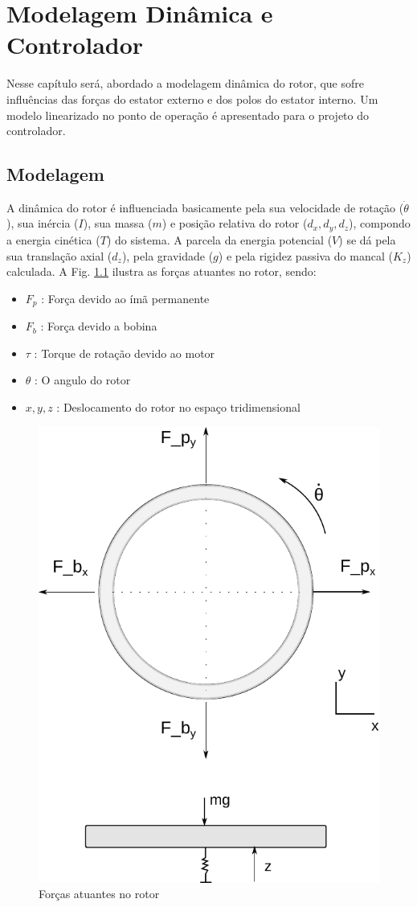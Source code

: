 \pagestyle{empty}
\cleardoublepage
\pagestyle{fancy}

\chapter{Modelagem Dinâmica e Controlador} \label{Cap:Modelagem:Dinamica}

 Nesse capítulo será, abordado a modelagem dinâmica do rotor, que sofre influências das forças do estator externo e dos polos do estator interno. Um modelo linearizado no ponto de operação é apresentado para o projeto do controlador.
 
\section{Modelagem}

A dinâmica do rotor é influenciada basicamente pela sua velocidade de rotação ($\dot{\theta}$), sua inércia ($I$), sua massa ($m$) e posição relativa do rotor ($d_x,d_y,d_z$), compondo a energia cinética ($T$) do sistema. A parcela da energia potencial ($V$) se dá pela sua translação axial ($d_z$), pela gravidade ($g$) e pela rigidez passiva do mancal ($K_z$) calculada. A Fig. \ref{fig:modelo:forcas} ilustra as forças atuantes no rotor, sendo:

 \begin{itemize}
 	\item $F_p$ : Força devido ao ímã permanente
 	\item $F_b$ : Força devido a bobina
 	\item $\tau$ : Torque de rotação devido ao motor
 	\item $\theta$ : O angulo do rotor
 	\item $x,y,z$ : Deslocamento do rotor no espaço tridimensional
 \end{itemize}

 \begin{figure}[th]
 	\centering
 	\includegraphics[width=0.7\linewidth]{../Figs/Modelagem/forcas}
 	\caption{Forças atuantes no rotor}
 	\label{fig:modelo:forcas}
 \end{figure}
 

